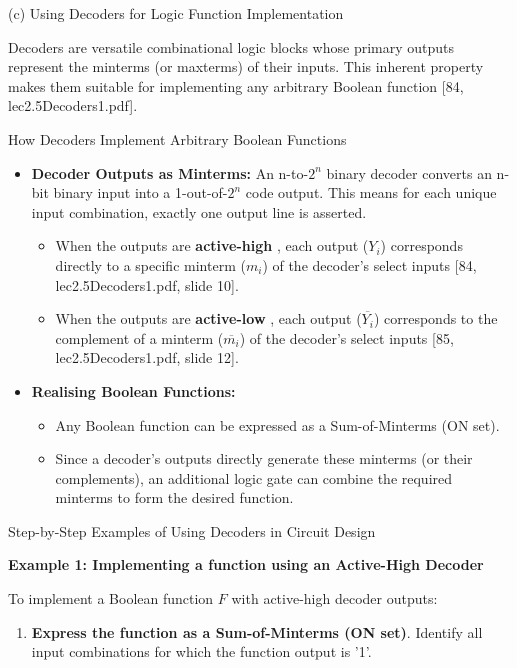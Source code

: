 \documentclass{article}
\begin{document}
\begin{itemize}
(c) Using Decoders for Logic Function Implementation

Decoders are versatile combinational logic blocks whose primary outputs represent the minterms (or maxterms) of their inputs. This inherent property makes them suitable for implementing any arbitrary Boolean function [84, lec2.5Decoders1.pdf].

How Decoders Implement Arbitrary Boolean Functions

\begin{itemize}
    \item \textbf{Decoder Outputs as Minterms:} An n-to-$2^n$ binary decoder converts an n-bit binary input into a 1-out-of-$2^n$ code output. This means for each unique input combination, exactly one output line is asserted.

        \begin{itemize}
            \item When the outputs are \textbf{active-high} , each output ($Y_i$) corresponds directly to a specific minterm ($m_i$) of the decoder's select inputs [84, lec2.5Decoders1.pdf, slide 10].
            \item When the outputs are \textbf{active-low} , each output ($\overline{Y_i}$) corresponds to the complement of a minterm ($\overline{m_i}$) of the decoder's select inputs [85, lec2.5Decoders1.pdf, slide 12].
        \end{itemize}

    \item \textbf{Realising Boolean Functions:}

        \begin{itemize}
            \item Any Boolean function can be expressed as a Sum-of-Minterms (ON set).
            \item Since a decoder's outputs directly generate these minterms (or their complements), an additional logic gate can combine the required minterms to form the desired function.
        \end{itemize}
\end{itemize}

Step-by-Step Examples of Using Decoders in Circuit Design

\textbf{Example 1: Implementing a function using an Active-High Decoder}

To implement a Boolean function $F$ with active-high decoder outputs:

\begin{enumerate}
\item \textbf{Express the function as a Sum-of-Minterms (ON set)}. Identify all input combinations for which the function output is '1'.


\end{enumerate}
\end{itemize}
\end{document}
